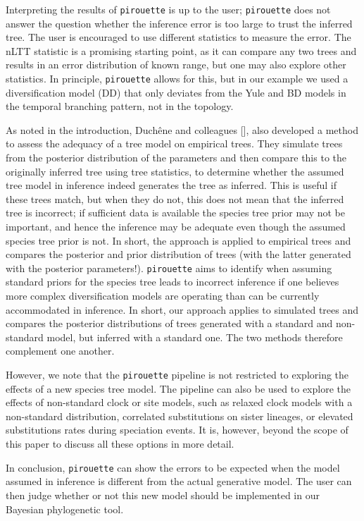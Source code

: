 Interpreting the results of \verb;pirouette; is up to the user; 
\verb;pirouette; does not answer the question 
whether the inference error is too large to trust the inferred tree. The user is encouraged to use different statistics to measure the error. The nLTT statistic is
a promising starting point, as it can compare any two trees and 
results in an error distribution of known range, but one may also explore other statistics.
In principle, \verb;pirouette; allows for this, but in our example we used a diversification model (DD) that only deviates from the Yule and BD models in the temporal branching pattern, not in the topology.

As noted in the introduction, Duch\^{e}ne and colleagues [\cite{duchene2018phylodynamic}],
also developed a method to assess the adequacy of a tree model
on empirical trees. They simulate trees from the posterior distribution of the parameters and then compare this to the originally inferred tree using tree statistics, to determine whether the assumed tree model in inference indeed generates the tree as inferred. This is useful if these trees match, but when they do not, this does not mean that the inferred tree is incorrect; if sufficient data is available the species tree prior may not be important, and hence the inference may be adequate even though the assumed species tree prior is not. In short, the approach is applied to empirical trees and compares the posterior and prior distribution of trees (with the latter generated with the posterior parameters!).
\verb;pirouette; aims to identify when assuming standard priors for the species tree leads to incorrect inference if one believes more complex diversification models are operating than can be currently accommodated in inference. In short, our approach applies to simulated trees and compares the posterior distributions of trees generated with a standard and non-standard model, but inferred with a standard one. The two methods therefore complement one another.

However, we note that the \verb;pirouette; pipeline is not restricted 
to exploring the effects of a new species tree model. 
The pipeline can also be used to explore the effects of non-standard 
clock or site models, such as relaxed clock models with a non-standard 
distribution, correlated substitutions on sister lineages, or elevated 
substitutions rates during speciation events. 
It is, however, beyond the scope of this paper to discuss all these options 
in more detail.

In conclusion, \verb;pirouette; can show the errors to be expected
when the model assumed in inference is different from the 
actual generative model.
The user can then judge whether or not this new model should be implemented in our Bayesian phylogenetic tool. 

